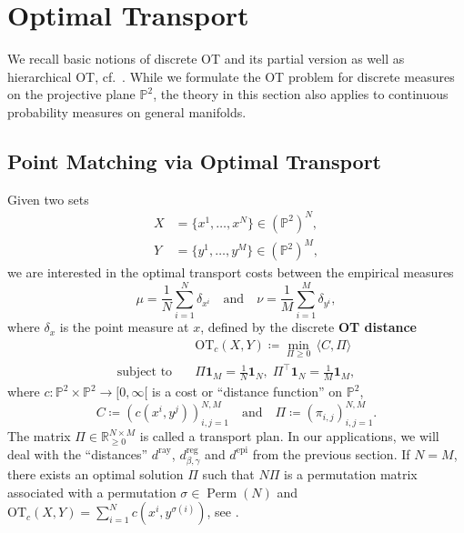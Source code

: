\documentclass[10pt, twocolumn]{article}
\theoremstyle{definition}
\newcommand{\R}{{\ensuremath{\mathbb{R}}}}
\begin{document}
\section{Optimal Transport} \label{sec:OT}
We recall basic notions of discrete OT and its partial version as well as hierarchical OT, cf.\ \cite{COTFNT}. 
While we formulate the OT problem for discrete measures on the projective plane $\mathbb P^2$, the theory in this section also applies to continuous probability measures on general manifolds.

\subsection{Point Matching via Optimal Transport}
%
Given two sets
\begin{align} \label{eq:point_clouds}
X&=\{x^1,\dots,x^N\}\in(\mathbb P^2)^N ,\\
Y&=\{y^1,\dots,y^M\}\in(\mathbb P^2)^M,
\end{align}
we are interested in the optimal transport costs between the empirical measures
\begin{equation} \label{eq:measures}
\mu = \frac1N \sum_{i=1}^{N} \delta_{x^i} 
\quad \text{and}\quad 
\nu = \frac1M\sum_{i=1}^{M} \delta_{y^i}, 
\end{equation}
where $\delta_x$ is the point measure at $x$,
defined by the discrete \textbf{OT distance}
\begin{equation}\label{eq:OT_one_to_one}
\begin{aligned}
&\text{OT}_c(X,Y) \coloneqq \min_{\Pi \ge 0} \, 
\langle C,\Pi \rangle\\
 \text{subject to} \quad
&\Pi \mathbf{1}_M = \frac1N \mathbf{1}_N, \;
\Pi^\top \mathbf{1}_N= \frac1M \mathbf{1}_M,
\end{aligned}
\end{equation}
where $c\colon\mathbb P^2\times\mathbb P^2\to[0,\infty[$ is a cost or ``distance function'' on $\mathbb P^2$,
$$
C \coloneqq \left( c(x^i,y^j) \right)_{i,j=1}^{N,M}
\quad \text{and}\quad 
\Pi \coloneqq \left(\pi_{i,j} \right)_{i,j=1}^{N,M}.
$$
The matrix $\Pi \in \R_{\geq 0}^{N \times M}$ is called a transport plan.
In our applications, we will deal with the ``distances''
$d^{\mathrm{ray}}$, $d^\mathrm{reg}_{\beta,\gamma}$ and
$d^{\mathrm{epi}}$
from the previous section.
If $N=M$, there exists an optimal solution $\Pi$ such that  $N \Pi$
is a permutation matrix associated with a permutation $\sigma\in\operatorname{Perm}(N)$
and 
$
\text{OT}_c(X,Y) = \sum_{i=1}^N c(x^i, y^{\sigma(i)} ) $, see \cite[Prop~2.1]{COTFNT}.
\end{document}
